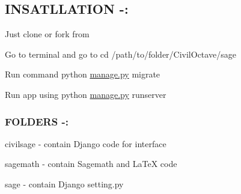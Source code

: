 \subsection*{I\+N\+S\+A\+T\+L\+L\+A\+T\+I\+O\+N -\/\+:}


\begin{DoxyEnumerate}
\item Just clone or fork from
\item Go to terminal and go to cd /path/to/folder/\+Civil\+Octave/sage
\item Run command python \hyperlink{manage_8py}{manage.\+py} migrate
\item Run app using python \hyperlink{manage_8py}{manage.\+py} runserver
\end{DoxyEnumerate}

\subsubsection*{F\+O\+L\+D\+E\+R\+S -\/\+:}


\begin{DoxyEnumerate}
\item civilsage -\/ contain Django code for interface
\item sagemath -\/ contain Sagemath and La\+Te\+X code
\item sage -\/ contain Django setting.\+py 
\end{DoxyEnumerate}